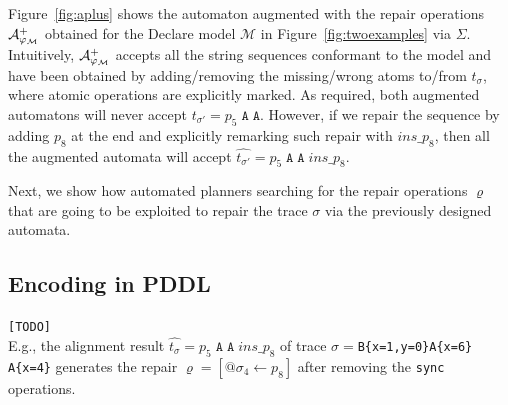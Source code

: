 Figure~\ref{fig:aplus} shows the automaton augmented with the repair operations $\mathcal{A}_{\varphi_{\tiny\mathcal{M}}}^+$ obtained for the Declare model $\mathcal{M}$ in Figure~\ref{fig:twoexamples} via $\Sigma$. Intuitively, $\mathcal{A}_{\varphi_{\tiny\mathcal{M}}}^+$ accepts all the string sequences conformant to the model and have been obtained by adding/removing the missing/wrong atoms to/from $t_\sigma$, where atomic operations are explicitly marked. As required, both augmented automatons will never accept $t_{\sigma'}=p_5\;\texttt{A}\;\texttt{A}$. However, if we repair the sequence by adding $p_8$ at the end and explicitly remarking such repair with $\textit{ins\_}p_8$, then all the augmented automata will accept $\hat{t_{\sigma'}}=p_5\;\texttt{A}\;\texttt{A}\;\textit{ins\_}p_8$. 

Next, we show how automated planners searching for the repair operations $\varrho$ that are going to be exploited to repair the trace $\sigma$ via the previously designed automata. 

\subsection{Encoding in PDDL}\label{ssec:eip}
\texttt{\color{red}[TODO]}
\\

E.g., the alignment result $\hat{t_\sigma}=p_5\;\texttt{A}\;\texttt{A}\;\textit{ins\_}p_8$ of trace $\sigma=$\texttt{B\{x=1,y=0\}A\{x=6\}\\A\{x=4\}} generates the repair $\varrho=[@\sigma_4\leftarrow p_8]$ after removing the \texttt{sync} operations.

